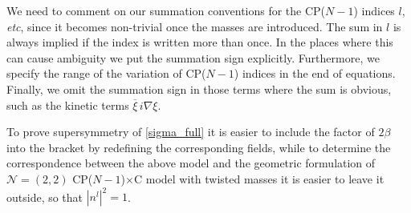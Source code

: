 \documentclass[12pt]{article}
\newcommand{\ntwot}{${\mathcal N}= \left(2,2\right) $ }
\newcommand{\ov}{\overline}
\newcommand{\CPC}{CP($N-1$)$\times$C }
\begin{document}
	We need to comment on our summation conventions for the CP($N-1$) indices $l$, {\it etc}, since
	it becomes non-trivial once the masses are introduced.
	The sum in $l$ is always implied if the index is written more than once.
	In the places where this can cause ambiguity we put the summation sign explicitly.
	Furthermore, we specify the range of the variation of CP($N-1$) indices
	in the end of equations.
	Finally, we omit the summation sign in those terms where the sum is obvious,
	such as the kinetic terms $ \ov{\xi}\, i\nabla \xi $.

	To prove supersymmetry of \eqref{sigma_full} it is easier to include the factor of $ 2\beta $ into 
	the bracket by redefining the corresponding fields, while to determine the correspondence between the 
	above model and the geometric formulation of \ntwot \CPC model with twisted masses it is easier to leave
	it outside, so that $ |n^l|^2 = 1 $.
\end{document}
